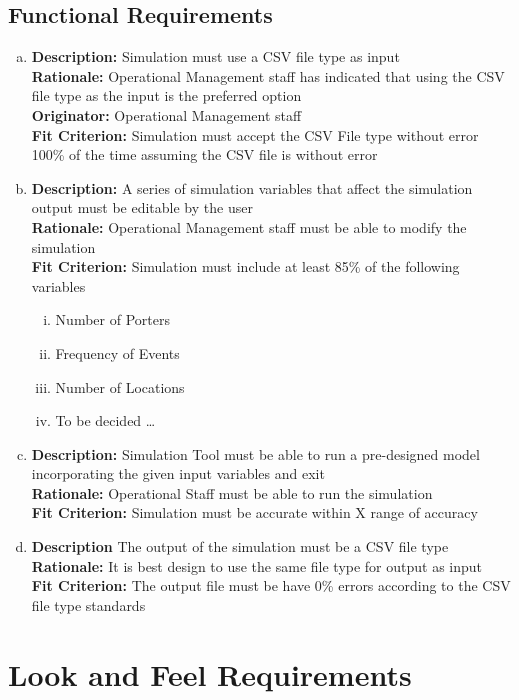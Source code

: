 \documentclass[paper=letter, fontsize=10pt]{scrartcl}
\numberwithin{equation}{section}		%
\numberwithin{figure}{section}			%
\numberwithin{table}{section}				%
\begin{document}
\subsection{Functional Requirements}
\begin{enumerate}[(a)]
	\item \textbf{Description:} Simulation must use a CSV file type as input
	\\ \textbf{Rationale:} Operational Management staff has indicated that using the CSV file type as the input is the preferred option
	\\ \textbf{Originator:} Operational Management staff
	\\ \textbf{Fit Criterion:} Simulation must accept the CSV File type without error 100\% of the time assuming the CSV file is without error
	\item \textbf{Description:} A series of simulation variables that affect the simulation output must be editable by the user
	\\ \textbf{Rationale:} Operational Management staff must be able to modify the simulation
	\\ \textbf{Fit Criterion:} Simulation must include at least 85\% of the following variables   
	\begin{enumerate}[(i)]
		\item Number of Porters
		\item Frequency of Events
		\item Number of Locations
		\item To be decided \ldots
	\end{enumerate}
	\item \textbf{Description:} Simulation Tool must be able to run a pre-designed model incorporating the given input variables and exit
	\\ \textbf{Rationale:} Operational Staff must be able to run the simulation
	\\ \textbf{Fit Criterion:} Simulation must be accurate within X range of accuracy 
	\item \textbf{Description} The output of the simulation must be a CSV file type
	\\ \textbf{Rationale:} It is best design to use the same file type for output as input
	\\ \textbf{Fit Criterion:} The output file must be have 0\% errors according to the CSV file type standards 
\end{enumerate}

\section{Look and Feel Requirements}
\end{document}
